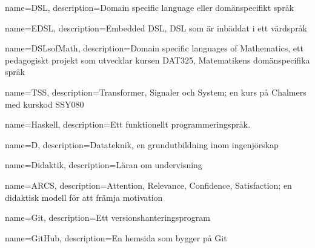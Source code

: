 {
    name=DSL,
    description={Domain specific language eller domänspecifikt språk}
}

{
    name=EDSL,
    description={Embedded DSL, DSL som är inbäddat i ett värdspråk}
}

{
    name=DSLsofMath,
    description={Domain specific languages of Mathematics, ett pedagogiskt projekt som utvecklar kursen DAT325, Matematikens domänspecifika språk}
}


{
    name=TSS,
    description={Transformer, Signaler och System; en kurs på Chalmers med kurskod SSY080}
}

{
	name=Haskell,
	description={Ett funktionellt programmeringspråk.}
}

{
    name=D,
    description={Datateknik, en grundutbildning inom ingenjörskap}
}

{
    name=Didaktik,
    description={Läran om undervisning}
}

{
    name=ARCS,
    description={Attention, Relevance, Confidence, Satisfaction; en didaktisk modell för att främja motivation}
}

{
    name=Git,
    description={Ett versionshanteringsprogram}
}

{
    name=GitHub,
    description={En hemsida som bygger på Git}
}